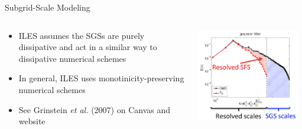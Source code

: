 \begin{frame}{Subgrid-Scale Modeling}

\begin{columns}[T]
    \begin{column}{.6\textwidth}
      \begin{minipage}[c][.6\textheight][c]{\linewidth}
      \begin{itemize}
      \item ILES assumes the SGSs are purely dissipative and act in a similar way to dissipative numerical schemes
      \item In general, ILES uses monotinicity-preserving numerical schemes
      \item See Grinstein \textit{et al.} (2007) on Canvas and website
      \end{itemize}
      \end{minipage}
    \end{column}
    \begin{column}{.6\textwidth}
    \includegraphics[width=0.95\textwidth]{decomp1}
    \end{column}
  \end{columns}
\end{frame}

